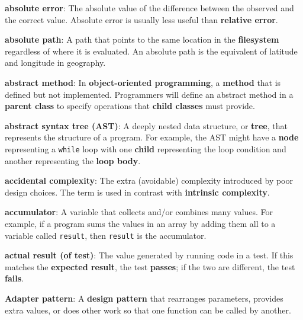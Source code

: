 \documentclass[krantzl]{krantz}
\newcommand{\glosskey}[1]{\textbf{#1}}
\begin{document}
\noindent \textbf{{\newline}\glosskey{absolute error}}: 
The absolute value of the difference between the observed and the correct value. Absolute error is usually less useful than \glosskey{relative error}.


\noindent \textbf{{\newline}\glosskey{absolute path}}: 
A path that points to the same location in the \glosskey{filesystem} regardless of where it is evaluated. An absolute path is the equivalent of latitude and longitude in geography.


\noindent \textbf{{\newline}\glosskey{abstract method}}: 
In \glosskey{object-oriented programming}, a \glosskey{method} that is defined but not implemented. Programmers will define an abstract method in a \glosskey{parent class} to specify operations that \glosskey{child classes} must provide.


\noindent \textbf{{\newline}\glosskey{abstract syntax tree} (AST)}: 
A deeply nested data structure, or \glosskey{tree}, that represents the structure of a program. For example, the AST might have a \glosskey{node} representing a \texttt{while} loop with one \glosskey{child} representing the loop condition and another representing the \glosskey{loop body}.


\noindent \textbf{{\newline}\glosskey{accidental complexity}}: 
The extra (avoidable) complexity introduced by poor design choices. The term is used in contrast with \glosskey{intrinsic complexity}.


\noindent \textbf{{\newline}\glosskey{accumulator}}: 
A variable that collects and/or combines many values.  For example, if a program sums the values in an array by adding them all to a variable called \texttt{result}, then \texttt{result} is the accumulator.


\noindent \textbf{{\newline}\glosskey{actual result (of test)}}: 
The value generated by running code in a test. If this matches the \glosskey{expected result}, the test \glosskey{passes}; if the two are different, the test \glosskey{fails}.


\noindent \textbf{{\newline}\glosskey{Adapter pattern}}: 
A \glosskey{design pattern} that rearranges parameters, provides extra values, or does other work so that one function can be called by another.
\end{document}
